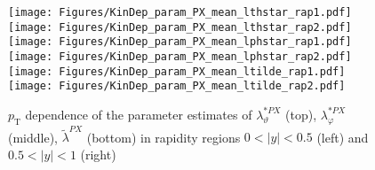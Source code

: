 \documentclass[12pt]{article}
\newcommand{\pT}{p_\mathrm{T}}
\newcommand{\absy}{\left |  y \right |}
\newcommand{\lamtildePX}{\tilde{\lambda}^{\scriptscriptstyle PX}}
\newcommand{\lamthstarPX}{\lambda^{* \scriptscriptstyle PX}_\vartheta}
\newcommand{\lamphstarPX}{\lambda^{* \scriptscriptstyle PX}_\varphi}
\begin{document}
\begin{figure}[htbp]
\centering
\texttt{[image: Figures/KinDep\_param\_PX\_mean\_lthstar\_rap1.pdf]}
\texttt{[image: Figures/KinDep\_param\_PX\_mean\_lthstar\_rap2.pdf]}
\texttt{[image: Figures/KinDep\_param\_PX\_mean\_lphstar\_rap1.pdf]}
\texttt{[image: Figures/KinDep\_param\_PX\_mean\_lphstar\_rap2.pdf]}
\texttt{[image: Figures/KinDep\_param\_PX\_mean\_ltilde\_rap1.pdf]}
\texttt{[image: Figures/KinDep\_param\_PX\_mean\_ltilde\_rap2.pdf]}
\caption{$\pT$ dependence of the parameter estimates of $\lamthstarPX$ (top), $\lamphstarPX$ (middle), $\lamtildePX$ (bottom) in rapidity regions $0<\absy<0.5$ (left) and $0.5<\absy<1$ (right)}
\end{figure}
\clearpage
\end{document}
